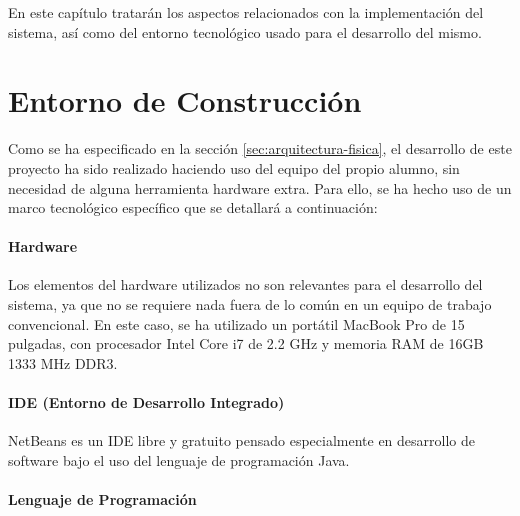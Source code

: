 

En este capí­tulo tratarán los aspectos relacionados con la implementación del sistema, así como del entorno tecnológico usado para el desarrollo del mismo.

\section{Entorno de Construcción}\label{sec:entorno-construcción}

Como se ha especificado en la sección \ref{sec:arquitectura-fisica}, el desarrollo de este proyecto ha sido realizado haciendo uso del equipo del propio alumno, sin necesidad de alguna herramienta hardware extra. Para ello, se ha hecho uso de un marco tecnológico específico que se detallará a continuación: 

\paragraph*{Hardware}

Los elementos del hardware utilizados no son relevantes para el desarrollo del sistema, ya que no se requiere nada fuera de lo común en un equipo de trabajo convencional. En este caso, se ha utilizado un portátil MacBook Pro de 15 pulgadas, con procesador Intel Core i7 de 2.2 GHz y memoria RAM de 16GB 1333 MHz DDR3.

\paragraph*{IDE (Entorno de Desarrollo Integrado)}

NetBeans \cite{NetBeans} es un IDE libre y gratuito pensado especialmente en desarrollo de software bajo el uso del lenguaje de programación Java.

\paragraph*{Lenguaje de Programación} 

